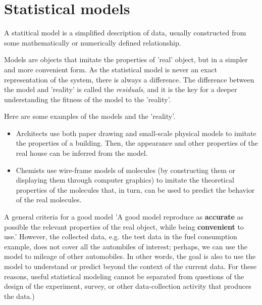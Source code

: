 
\chapter{Statistical models}
\label{chap:statistical-models}

A statitical model is a simplified description of data, usually
constructed from some mathematically or numerically defined
relationship.

Models are objects that imitate the properties of 'real' object, but in a
simpler and more convenient form. As the statistical model is never an exact
representation of the system, there is always a difference. The difference
between the model and 'reality' is called the {\it residuals}, and it is the key
for a deeper understanding the fitness of the model to the 'reality'.

Here are some examples of the models and the 'reality'.
\begin{itemize}
\item Architects use both paper drawing and small-scale physical
  models to imitate the properties of a building. Then, the appearance
  and other properties of the real house can be inferred from the
  model.

\item Chemists use wire-frame models of molecules (by constructing
  them or displaying them through computer graphics) to imitate the
  theoretical properties of the molecules that, in turn, can be used
  to predict the behavior of the real molecules.
\end{itemize}

A general criteria for a good model 'A good model reproduce as
{\bf accurate} as possible the relevant properties of the real object,
while being {\bf convenient} to use.' However, the collected data,
e.g. the test data in the fuel consumption example, does not cover all
the autombiles of interest; perhaps, we can use the model to mileage
of other automobiles. In other words, the goal is also to use the
model to understand or predict beyond the context of the current
data. For these reasons, useful statistical modeling cannot be
separated from questions of the design of the experiment, survey, or
other data-collection activity that produces the data.)
 
